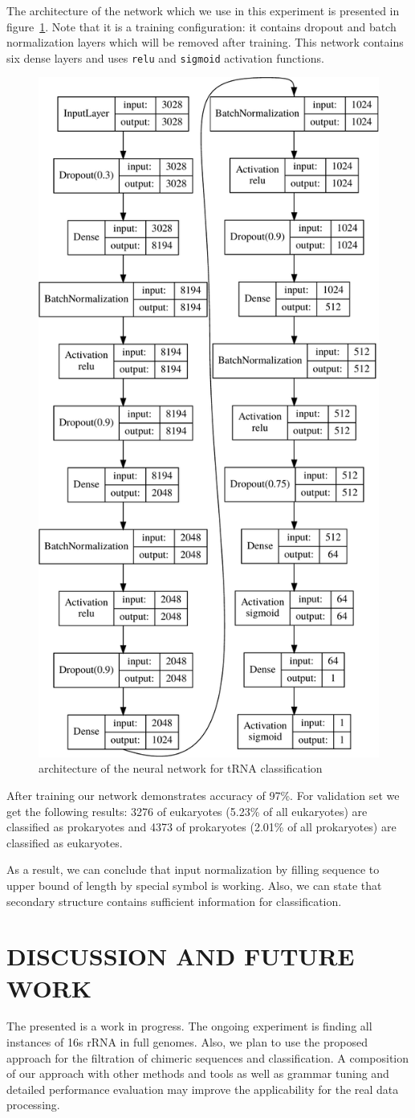 \documentclass[a4paper,twoside]{article}
\begin{document}
The architecture of the network which we use in this experiment is presented in figure~\ref{fig:nn}.
Note that it is a training configuration: it contains dropout and batch normalization layers which will be removed after training.
This network contains six dense layers and uses \verb|relu| and \verb|sigmoid| activation functions.

\begin{figure}
\centering
\includegraphics[width=.4\textwidth]{figures/model-crop.pdf}
\caption{architecture of the neural network for tRNA classification}
\label{fig:nn}
\end{figure}

After training our network demonstrates accuracy of 97\%. 
For validation set we get the following results: 3276 of eukaryotes (5.23\% of all eukaryotes) are classified as prokaryotes and 4373 of prokaryotes (2.01\% of all prokaryotes) are classified as eukaryotes. 

As a result, we can conclude that input normalization by filling sequence to upper bound of length by special symbol is working.
Also, we can state that secondary structure contains sufficient information for classification.


\section{\uppercase{Discussion and Future Work}}
\label{sec:Discussion}

\noindent The presented is a work in progress. 
The ongoing experiment is finding all instances of 16s rRNA in full genomes.
Also, we plan to use the proposed approach for the filtration of chimeric sequences and classification.
A composition of our approach with other methods and tools as well as grammar tuning and detailed performance evaluation may improve the applicability for the real data processing.
\end{document}
